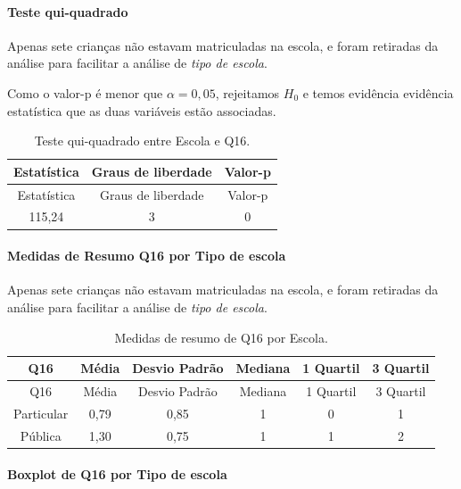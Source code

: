 \documentclass[]{article}
\let\oldparagraph\paragraph
\renewcommand{\paragraph}[1]{\oldparagraph{#1}\mbox{}}
\begin{document}
\hypertarget{teste-qui-quadrado-17}{%
\paragraph{Teste qui-quadrado}\label{teste-qui-quadrado-17}}

Apenas sete crianças não estavam matriculadas na escola, e foram retiradas da análise para facilitar a análise de \emph{tipo de escola}.

Como o valor-p é menor que \(\alpha=0,05\), rejeitamos \(H_0\) e temos evidência evidência estatística que as duas variáveis estão associadas.

\begin{longtable}[]{@{}ccc@{}}
\caption{\label{tab:unnamed-chunk-173}Teste qui-quadrado entre Escola e Q16.}\tabularnewline
\toprule
Estatística & Graus de liberdade & Valor-p\tabularnewline
\midrule
\endfirsthead
\toprule
Estatística & Graus de liberdade & Valor-p\tabularnewline
\midrule
\endhead
115,24 & 3 & 0\tabularnewline
\bottomrule
\end{longtable}

\cleardoublepage

\hypertarget{medidas-de-resumo-q16-por-tipo-de-escola}{%
\paragraph{Medidas de Resumo Q16 por Tipo de escola}\label{medidas-de-resumo-q16-por-tipo-de-escola}}

Apenas sete crianças não estavam matriculadas na escola, e foram retiradas da análise para facilitar a análise de \emph{tipo de escola}.

\begin{longtable}[]{@{}cccccc@{}}
\caption{\label{tab:unnamed-chunk-174}Medidas de resumo de Q16 por Escola.}\tabularnewline
\toprule
Q16 & Média & Desvio Padrão & Mediana & 1 Quartil & 3 Quartil\tabularnewline
\midrule
\endfirsthead
\toprule
Q16 & Média & Desvio Padrão & Mediana & 1 Quartil & 3 Quartil\tabularnewline
\midrule
\endhead
Particular & 0,79 & 0,85 & 1 & 0 & 1\tabularnewline
Pública & 1,30 & 0,75 & 1 & 1 & 2\tabularnewline
\bottomrule
\end{longtable}

\hypertarget{boxplot-de-q16-por-tipo-de-escola}{%
\paragraph{Boxplot de Q16 por Tipo de escola}\label{boxplot-de-q16-por-tipo-de-escola}}
\end{document}
